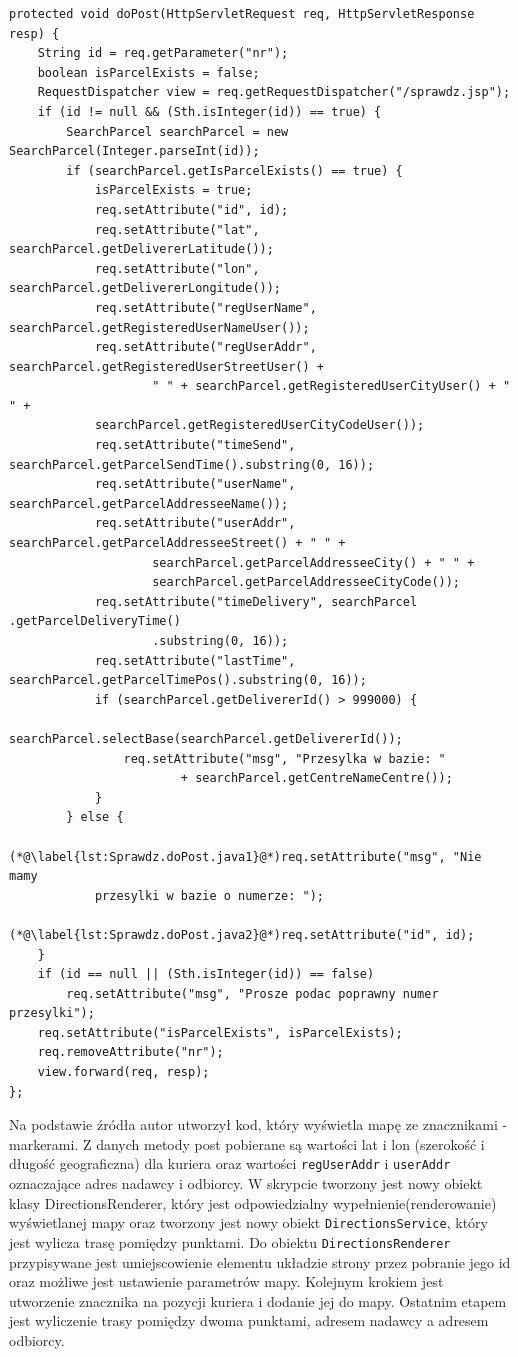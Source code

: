 \documentclass[eng,printmode,oneside]{mgr}
\begin{document}
\begin{lstlisting}[caption=Fragment klasy Sprawdz.Java\,
metoda doPost(),label=lst:Sprawdz.doPost.java]
protected void doPost(HttpServletRequest req, HttpServletResponse resp) {
	String id = req.getParameter("nr");
	boolean isParcelExists = false;
	RequestDispatcher view = req.getRequestDispatcher("/sprawdz.jsp");
	if (id != null && (Sth.isInteger(id)) == true) {
		SearchParcel searchParcel = new SearchParcel(Integer.parseInt(id));
		if (searchParcel.getIsParcelExists() == true) {
			isParcelExists = true;
			req.setAttribute("id", id);
			req.setAttribute("lat", searchParcel.getDelivererLatitude());
			req.setAttribute("lon", searchParcel.getDelivererLongitude());
			req.setAttribute("regUserName",	searchParcel.getRegisteredUserNameUser());
			req.setAttribute("regUserAddr",	searchParcel.getRegisteredUserStreetUser() +
					" " + searchParcel.getRegisteredUserCityUser() + " " +
			searchParcel.getRegisteredUserCityCodeUser()); 
			req.setAttribute("timeSend", searchParcel.getParcelSendTime().substring(0, 16));
			req.setAttribute("userName", searchParcel.getParcelAddresseeName());
			req.setAttribute("userAddr", searchParcel.getParcelAddresseeStreet() + " " +
					searchParcel.getParcelAddresseeCity() + " "	+ 
					searchParcel.getParcelAddresseeCityCode());
			req.setAttribute("timeDelivery", searchParcel .getParcelDeliveryTime()
					.substring(0, 16)); 
			req.setAttribute("lastTime", searchParcel.getParcelTimePos().substring(0, 16));
			if (searchParcel.getDelivererId() > 999000) {
				searchParcel.selectBase(searchParcel.getDelivererId());
				req.setAttribute("msg", "Przesylka w bazie: "
						+ searchParcel.getCentreNameCentre());
			}
		} else {
			(*@\label{lst:Sprawdz.doPost.java1}@*)req.setAttribute("msg", "Nie mamy
			przesylki w bazie o numerze: ");
			(*@\label{lst:Sprawdz.doPost.java2}@*)req.setAttribute("id", id); 
	}
	if (id == null || (Sth.isInteger(id)) == false)
		req.setAttribute("msg", "Prosze podac poprawny numer przesylki"); 
	req.setAttribute("isParcelExists", isParcelExists);
	req.removeAttribute("nr");
	view.forward(req, resp);
};
\end{lstlisting}

Na podstawie źródła \cite{developer.google.maps} autor utworzył kod,
który wyświetla mapę ze znacznikami - markerami. Z danych metody post pobierane
są wartości lat i lon (szerokość i długość geograficzna) dla kuriera oraz wartości
\texttt{regUserAddr} i \texttt{userAddr} oznaczające adres nadawcy i odbiorcy. W
skrypcie tworzony jest nowy obiekt klasy DirectionsRenderer, który jest odpowiedzialny
wypełnienie(renderowanie) wyświetlanej mapy oraz tworzony jest nowy obiekt
\texttt{DirectionsService}, który jest wylicza trasę pomiędzy punktami.
Do obiektu \texttt{DirectionsRenderer} przypisywane jest umiejscowienie elementu
układzie strony przez pobranie jego id oraz możliwe jest ustawienie parametrów mapy.
Kolejnym krokiem jest utworzenie znacznika na pozycji kuriera i dodanie jej do
mapy. Ostatnim etapem jest wyliczenie trasy pomiędzy dwoma punktami, adresem
nadawcy a adresem odbiorcy.
\end{document}
